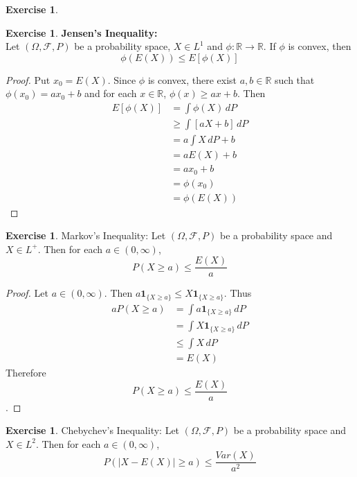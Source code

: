\documentclass[12pt]{amsart}
\theoremstyle{definition}
\newtheorem{ex}[definition]{Exercise}
\newcommand{\Om}{\Omega}
\newcommand{\R}{\mathbb{R}}
\newcommand{\MF}{\mathcal{F}}
\newcommand{\dP}{\, d P}
\begin{document}
	\begin{ex}
		
	\end{ex}
	
	\begin{ex} \textbf{Jensen's Inequality:} \\
		Let $(\Om, \MF, P)$ be a probability space, $X \in L^1$ and $\phi:\R \rightarrow \R$. If $\phi$ is convex, then $$\phi(E(X)) \leq E[\phi(X)]$$
	\end{ex}
	
	\begin{proof}
		Put $x_0 = E(X)$. Since $\phi$ is convex, there exist $a,b \in \R$ such that $\phi(x_0) = ax_0+b$ and for each $x \in \R$, $\phi(x) \geq ax+b$. Then \begin{align*}
			E[\phi(X)] 
			&= \int\phi(X) \dP \\
			&\geq \int[ aX+b ]\dP \\
			&= a\int X \dP +b \\
			&= aE(X) +b \\
			&= ax_0+b \\
			&= \phi(x_0) \\
			&= \phi(E(X))
		\end{align*}
	\end{proof}
	
	\begin{ex}{Markov's Inequality:}
		Let $(\Om, \MF, P)$ be a probability space and $X \in L^+$. Then for each $a \in (0,\infty)$, $$P(X \geq a) \leq \frac{E(X)}{a}$$
	\end{ex}
	
	\begin{proof}
		Let $a \in (0,\infty)$. Then $a \mathbf{1}_{\{X \geq a\}} \leq X \mathbf{1}_{\{X \geq a\}}$. Thus 
		\begin{align*}
			a P(X \geq a) 
			&= \int a \mathbf{1}_{\{X \geq a\}} \dP\\
			&= \int X \mathbf{1}_{\{X \geq a\}} \dP\\
			&\leq \int X \dP \\
			&= E(X)
		\end{align*}
		Therefore $$P(X \geq a) \leq \frac{E(X)}{a}$$. 
	\end{proof}
	
	\begin{ex}{Chebychev's Inequality:}
		Let $(\Om, \MF, P)$ be a probability space and $X \in L^2$. Then for each $a \in (0, \infty)$, $$P(| X - E(X) | \geq a) \leq \frac{Var(X)}{a^2}$$
	\end{ex}
	
\end{document}
